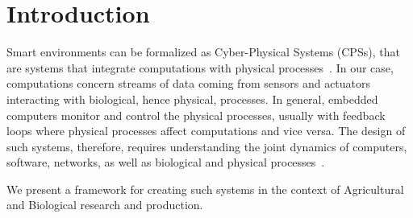 \section{Introduction}\label{sec:introduction}


Smart environments can be formalized as Cyber-Physical Systems (CPSs), that are
systems that integrate computations with physical processes~\cite{alur2015principles, lee2016introduction}. In our case, computations concern streams of data coming from
sensors and actuators interacting with biological, hence physical, processes.
In general, embedded computers monitor and control the physical processes, usually with feedback loops where physical processes affect computations and vice versa. The design of such systems, therefore, requires understanding the joint dynamics of computers, software, networks, as well as biological and physical processes~\cite{derler2012modeling}.

We present a framework for creating such systems in the context of Agricultural and Biological research and production.



